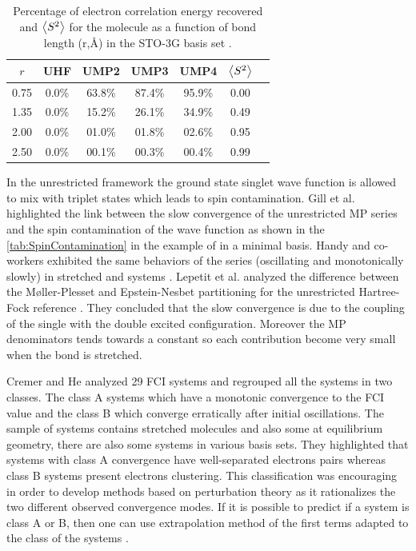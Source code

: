 \documentclass[11pt,a4paper]{article}
\begin{document}
{\begin{table}[h!]
    \centering
    \begin{tabular}{c c c c c c c}
\hline
 $r$ & UHF & UMP2 & UMP3 & UMP4 & $\expval{S^2}$ \\
\hline
0.75 & 0.0\% & 63.8\% & 87.4\% & 95.9\% & 0.00\\
1.35 & 0.0\% & 15.2\% & 26.1\% & 34.9\% & 0.49\\
2.00 & 0.0\% & 01.0\% & 01.8\% & 02.6\% & 0.95\\
2.50 & 0.0\% & 00.1\% & 00.3\% & 00.4\% & 0.99\\
\hline
\end{tabular}
    \caption{\centering Percentage of electron correlation energy recovered and $\expval{S^2}$ for the  molecule as a function of bond length (r,\si{\angstrom}) in the STO-3G basis set \cite{Gill_1988}.}
    \label{tab:SpinContamination}
\end{table}

In the unrestricted framework the ground state singlet wave function is allowed to mix with triplet states which leads to spin contamination. Gill et al. highlighted the link between the slow convergence of the unrestricted MP series and the spin contamination of the wave function as shown in the \autoref{tab:SpinContamination} in the example of  in a minimal basis. Handy and co-workers exhibited the same behaviors of the series (oscillating and monotonically slowly) in stretched  and  systems \cite{Handy_1985}. Lepetit et al. analyzed the difference between the M{\o}ller-Plesset and Epstein-Nesbet partitioning for the unrestricted Hartree-Fock reference \cite{Lepetit_1988}. They concluded that the slow convergence is due to the coupling of the single with the double excited configuration. Moreover the MP denominators tends towards a constant so each contribution become very small when the bond is stretched.

Cremer and He analyzed 29 FCI systems \cite{Cremer_1996} and regrouped all the systems in two classes. The class A systems which have a monotonic convergence to the FCI value and the class B which converge erratically after initial oscillations. The sample of systems contains stretched molecules and also some at equilibrium geometry, there are also some systems in various basis sets. They highlighted that systems with class A convergence have well-separated electrons pairs whereas class B systems present electrons clustering. This classification was encouraging in order to develop methods based on perturbation theory as it rationalizes the two different observed convergence modes. If it is possible to predict if a system is class A or B, then one can use extrapolation method of the first terms adapted to the class of the systems \cite{Cremer_1996}.

}
\end{document}
